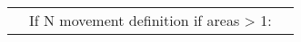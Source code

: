 \begin{center}
\begin{longtable}{p{0.5cm} p{2cm} p{12cm}}



		\pagebreak
		\multicolumn{2}{l}{COND} & \multicolumn{1}{l}{If N movement definition if areas > 1:}\\
		




\end{longtable}
\end{center}
